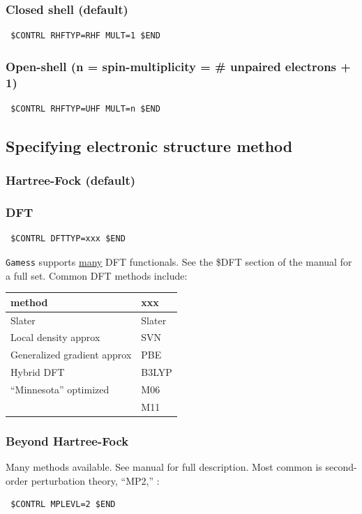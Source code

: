 \documentclass[11pt]{article}
\begin{document}
\subsubsection{Closed shell (default)}
\label{sec:org4227801}
\begin{verbatim}
 $CONTRL RHFTYP=RHF MULT=1 $END
\end{verbatim}

\subsubsection{Open-shell (n = spin-multiplicity = \# unpaired electrons + 1)}
\label{sec:org396efa3}
\begin{verbatim}
 $CONTRL RHFTYP=UHF MULT=n $END
\end{verbatim}
\subsection{Specifying electronic structure method}
\label{sec:org5466632}
\subsubsection{Hartree-Fock (default)}
\label{sec:org041e257}
\subsubsection{DFT}
\label{sec:orgbeb34cb}
\begin{verbatim}
 $CONTRL DFTTYP=xxx $END
\end{verbatim}
\texttt{Gamess} supports \uline{many} DFT functionals.  See the \$DFT section of the manual for a full set.  Common DFT methods include:
\begin{center}
\begin{tabular}{ll}
\hline
method & xxx\\
\hline
Slater & Slater\\
Local density approx & SVN\\
Generalized gradient approx & PBE\\
Hybrid DFT & B3LYP\\
``Minnesota'' optimized & M06\\
 & M11\\
\hline
\end{tabular}
\end{center}
\subsubsection{Beyond Hartree-Fock}
\label{sec:org64a0597}
Many methods available.  See manual for full description.  Most common is second-order perturbation theory, ``MP2,'' :
\begin{verbatim}
 $CONTRL MPLEVL=2 $END
\end{verbatim}
\end{document}
